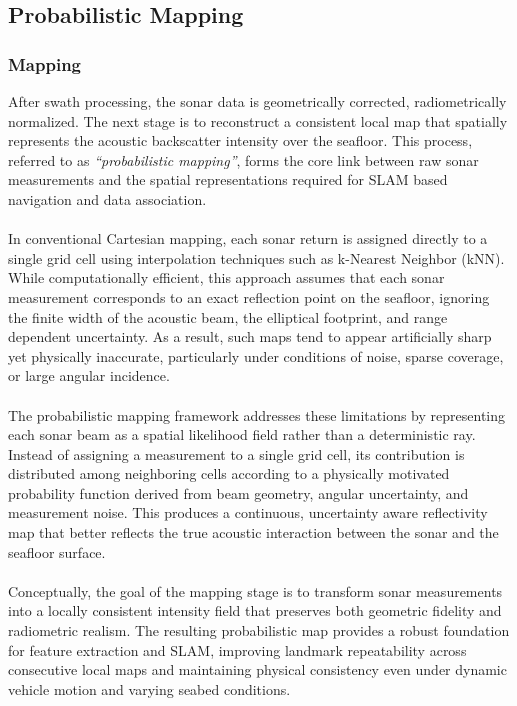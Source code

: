 \subsection{Probabilistic Mapping}
\subsubsection{Mapping}
After swath processing, the sonar data is geometrically corrected, radiometrically normalized. The next stage is to reconstruct a consistent local map that spatially represents the acoustic backscatter intensity over the seafloor. This process, referred to as \textit{``probabilistic mapping''}, forms the core link between raw sonar measurements and the spatial representations required for SLAM based navigation and data association.
\\ \\
In conventional Cartesian mapping, each sonar return is assigned directly to a single grid cell using interpolation techniques such as k-Nearest Neighbor (kNN). While computationally efficient, this approach assumes that each sonar measurement corresponds to an exact reflection point on the seafloor, ignoring the finite width of the acoustic beam, the elliptical footprint, and range dependent uncertainty. As a result, such maps tend to appear artificially sharp yet physically inaccurate, particularly under conditions of noise, sparse coverage, or large angular incidence.
\\ \\
The probabilistic mapping framework addresses these limitations by representing each sonar beam as a spatial likelihood field rather than a deterministic ray. Instead of assigning a measurement to a single grid cell, its contribution is distributed among neighboring cells according to a physically motivated probability function derived from beam geometry, angular uncertainty, and measurement noise. This produces a continuous, uncertainty aware reflectivity map that better reflects the true acoustic interaction between the sonar and the seafloor surface.
\\ \\
Conceptually, the goal of the mapping stage is to transform sonar measurements into a locally consistent intensity field that preserves both geometric fidelity and radiometric realism. The resulting probabilistic map provides a robust foundation for feature extraction and SLAM, improving landmark repeatability across consecutive local maps and maintaining physical consistency even under dynamic vehicle motion and varying seabed conditions.


